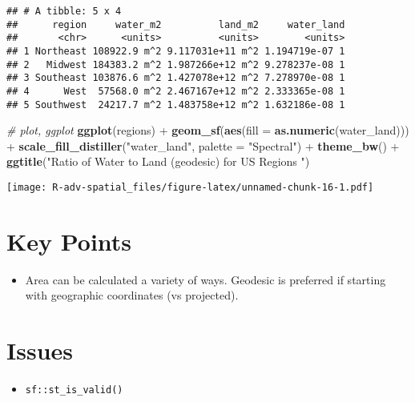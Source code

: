 \documentclass[]{book}
\newenvironment{Shaded}{\begin{snugshade}}{\end{snugshade}}
\newcommand{\KeywordTok}[1]{\textcolor[rgb]{0.13,0.29,0.53}{\textbf{{#1}}}}
\newcommand{\DataTypeTok}[1]{\textcolor[rgb]{0.13,0.29,0.53}{{#1}}}
\newcommand{\StringTok}[1]{\textcolor[rgb]{0.31,0.60,0.02}{{#1}}}
\newcommand{\CommentTok}[1]{\textcolor[rgb]{0.56,0.35,0.01}{\textit{{#1}}}}
\newcommand{\NormalTok}[1]{{#1}}
\providecommand{\tightlist}{%
  \setlength{\itemsep}{0pt}\setlength{\parskip}{0pt}}
\begin{document}
\begin{verbatim}
## # A tibble: 5 x 4
##      region     water_m2          land_m2     water_land
##       <chr>      <units>          <units>        <units>
## 1 Northeast 108922.9 m^2 9.117031e+11 m^2 1.194719e-07 1
## 2   Midwest 184383.2 m^2 1.987266e+12 m^2 9.278237e-08 1
## 3 Southeast 103876.6 m^2 1.427078e+12 m^2 7.278970e-08 1
## 4      West  57568.0 m^2 2.467167e+12 m^2 2.333365e-08 1
## 5 Southwest  24217.7 m^2 1.483758e+12 m^2 1.632186e-08 1
\end{verbatim}

\begin{Shaded}
\begin{Highlighting}[]
\CommentTok{# plot, ggplot}
\KeywordTok{ggplot}\NormalTok{(regions) +}
\StringTok{  }\KeywordTok{geom_sf}\NormalTok{(}\KeywordTok{aes}\NormalTok{(}\DataTypeTok{fill =} \KeywordTok{as.numeric}\NormalTok{(water_land))) +}
\StringTok{  }\KeywordTok{scale_fill_distiller}\NormalTok{(}\StringTok{"water_land"}\NormalTok{, }\DataTypeTok{palette =} \StringTok{"Spectral"}\NormalTok{) +}
\StringTok{  }\KeywordTok{theme_bw}\NormalTok{() +}
\StringTok{  }\KeywordTok{ggtitle}\NormalTok{(}\StringTok{"Ratio of Water to Land (geodesic) for US Regions "}\NormalTok{)}
\end{Highlighting}
\end{Shaded}

\texttt{[image: R-adv-spatial\_files/figure-latex/unnamed-chunk-16-1.pdf]}

\section{Key Points}\label{key-points-1}

\begin{itemize}
\tightlist
\item
  Area can be calculated a variety of ways. Geodesic is preferred if
  starting with geographic coordinates (vs projected).
\end{itemize}

\section{Issues}\label{issues-1}

\begin{itemize}
\tightlist
\item
  \texttt{sf::st\_is\_valid()}
\end{itemize}
\end{document}
